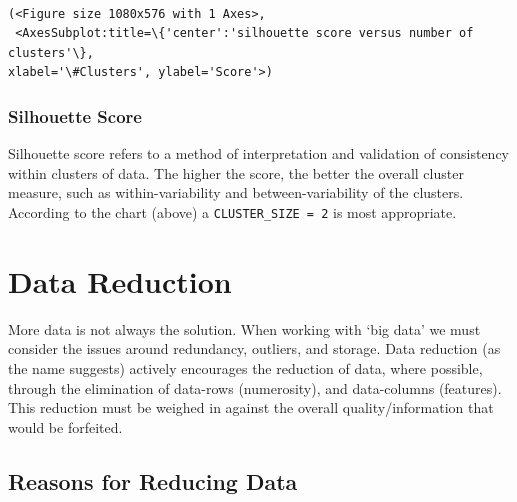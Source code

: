\documentclass[11pt]{article}
\makeatletter
\newcommand{\boxspacing}{\kern\kvtcb@left@rule\kern\kvtcb@boxsep}
\newcommand{\prompt}[4]{
        {\ttfamily\llap{{\color{#2}[#3]:\hspace{3pt}#4}}\vspace{-\baselineskip}}
    }
\makeatother
\begin{document}
    \begin{center}
    \end{center}
    { \hspace*{\fill} \\}
    
            \begin{tcolorbox}[breakable, size=fbox, boxrule=.5pt, pad at break*=1mm, opacityfill=0]
\prompt{Out}{outcolor}{60}{\boxspacing}
\begin{Verbatim}[commandchars=\\\{\}]
(<Figure size 1080x576 with 1 Axes>,
 <AxesSubplot:title=\{'center':'silhouette score versus number of clusters'\},
xlabel='\#Clusters', ylabel='Score'>)
\end{Verbatim}
\end{tcolorbox}
        
    \hypertarget{silhouette-score}{%
\subsubsection{Silhouette Score}\label{silhouette-score}}

Silhouette score refers to a method of interpretation and validation of
consistency within clusters of data. The higher the score, the better
the overall cluster measure, such as within-variability and
between-variability of the clusters. According to the chart (above) a
\texttt{CLUSTER\_SIZE\ =\ 2} is most appropriate.

    \hypertarget{data-reduction}{%
\section{Data Reduction}\label{data-reduction}}

More data is not always the solution. When working with `big data' we
must consider the issues around redundancy, outliers, and storage. Data
reduction (as the name suggests) actively encourages the reduction of
data, where possible, through the elimination of data-rows (numerosity),
and data-columns (features). This reduction must be weighed in against
the overall quality/information that would be forfeited.

\hypertarget{reasons-for-reducing-data}{%
\subsection{Reasons for Reducing Data}\label{reasons-for-reducing-data}}
\end{document}
